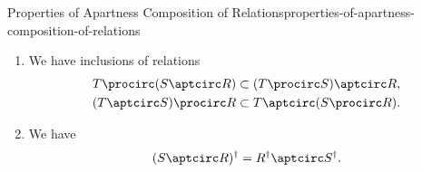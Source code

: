 \begin{proposition}{Properties of Apartness Composition of Relations}{properties-of-apartness-composition-of-relations}
\begin{enumerate}
\begin{align*}
                (S\procirc R)^{\sfc} &= S^{\sfc}\aptcirc R^{\sfc},
            \end{align*}
            where $(-)^{\sfc}$ is the complement functor of . In particular, $\mathord{\aptcirc}$ is a special case of composition of relations, as we have
            \[
                S\aptcirc R%
                =%
                (S^{\sfc}\procirc R^{\sfc})^{\sfc}.
            \]%
            This is also compatible with units, as we have $\nabla^{\sfc}_{A}=\Delta_{A}$.
        \item\label{properties-of-apartness-composition-of-relations-linear-distributivity}We have inclusions of relations
            \begin{align*}
                T\procirc(S\aptcirc R)  &\subset (T\procirc S)\aptcirc R,\\
                (T\aptcirc S)\procirc R &\subset T\aptcirc(S\procirc R).
            \end{align*}
        \item\label{properties-of-apartness-composition-of-relations-interaction-with-converses}We have
            \[
                (S\aptcirc R)^{\dagger}
                =
                R^{\dagger}\aptcirc S^{\dagger}.
            \]%
    \end{enumerate}
\end{proposition}
